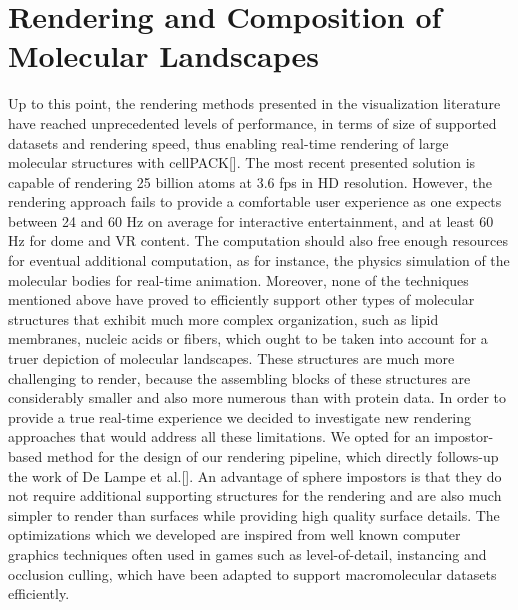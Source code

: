 
%
%

\section{Rendering and Composition of Molecular Landscapes}

Up to this point, the rendering methods presented in the visualization literature have reached unprecedented levels of performance, in terms of size of supported datasets and rendering speed, thus enabling real-time rendering of large molecular structures with cellPACK[].
The most recent presented solution is capable of rendering 25 billion atoms at 3.6 fps in HD resolution.
However, the rendering approach fails to provide a comfortable user experience as one expects between 24 and 60 Hz on average for interactive entertainment, and at least 60 Hz for dome and VR content.
The computation should also free enough resources for eventual additional computation, as for instance, the physics simulation of the molecular bodies for real-time animation.
Moreover, none of the techniques mentioned above have proved to efficiently support other types of molecular structures that exhibit much more complex organization, such as lipid membranes, nucleic acids or fibers, which ought to be taken into account for a truer depiction of molecular landscapes.
These structures are much more challenging to render, because the assembling blocks of these structures are considerably smaller and also more numerous than with protein data.
In order to provide a true real-time experience we decided to investigate new rendering approaches that would address all these limitations.
We opted for an impostor-based method for the design of our rendering pipeline, which directly follows-up the work of De Lampe et al.[].
An advantage of sphere impostors is that they do not require additional supporting structures for the rendering and are also much simpler to render than surfaces while providing high quality surface details.
The optimizations which we developed are inspired from well known computer graphics techniques often used in games such as level-of-detail, instancing and occlusion culling, which have been adapted to support macromolecular datasets efficiently.

